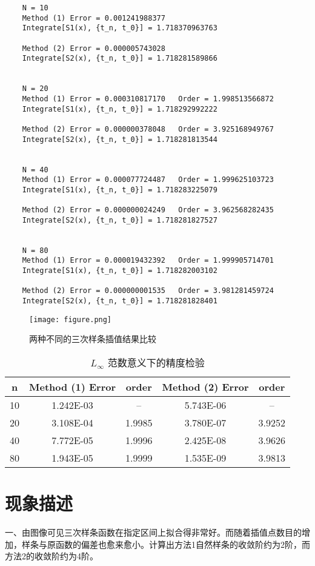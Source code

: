 \documentclass{ctexart}
\begin{document}
\begin{verbatim}
	N = 10
	Method (1) Error = 0.001241988377	
	Integrate[S1(x), {t_n, t_0}] = 1.718370963763
	
	Method (2) Error = 0.000005743028	
	Integrate[S2(x), {t_n, t_0}] = 1.718281589866
	
	
	N = 20
	Method (1) Error = 0.000310817170	Order = 1.998513566872
	Integrate[S1(x), {t_n, t_0}] = 1.718292992222
	
	Method (2) Error = 0.000000378048	Order = 3.925168949767
	Integrate[S2(x), {t_n, t_0}] = 1.718281813544
	
	
	N = 40
	Method (1) Error = 0.000077724487	Order = 1.999625103723
	Integrate[S1(x), {t_n, t_0}] = 1.718283225079
	
	Method (2) Error = 0.000000024249	Order = 3.962568282435
	Integrate[S2(x), {t_n, t_0}] = 1.718281827527
	
	
	N = 80
	Method (1) Error = 0.000019432392	Order = 1.999905714701
	Integrate[S1(x), {t_n, t_0}] = 1.718282003102
	
	Method (2) Error = 0.000000001535	Order = 3.981281459724
	Integrate[S2(x), {t_n, t_0}] = 1.718281828401
\end{verbatim}

\begin{figure}[H]
	\centering
	\texttt{[image: figure.png]}
	\caption{两种不同的三次样条插值结果比较} \label{figure.label}
\end{figure}

\begin{table}[htb]
	\centering
	\bigskip
	\begin{small}
		\begin{tabular}{|c|cc|cc|}
			\hline
			n & Method (1) Error & order & Method (2) Error & order\\\hline
			10& 1.242E-03 & -- & 5.743E-06 & --\\
			20& 3.108E-04 & 1.9985 & 3.780E-07 & 3.9252 \\
			40& 7.772E-05 & 1.9996 & 2.425E-08 & 3.9626\\
			80& 1.943E-05 & 1.9999 & 1.535E-09 & 3.9813\\\hline
		\end{tabular}
	\end{small}
	\caption{\label{table.label} $L_\infty$ 范数意义下的精度检验} 
\end{table}

\section*{现象描述}
	\noindent 一、由图像可见三次样条函数在指定区间上拟合得非常好。而随着插值点数目的增加，样条与原函数的偏差也愈来愈小。计算出方法1自然样条的收敛阶约为2阶，而方法2的收敛阶约为4阶。
	
\end{document}
